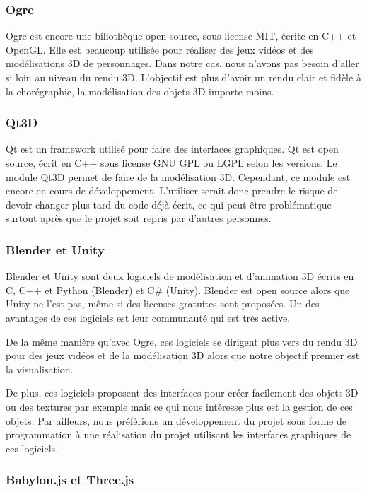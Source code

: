 \subsubsection{Ogre}

Ogre est encore une biliothèque open source, sous license MIT, écrite en C++ et OpenGL. Elle est beaucoup utilisée pour réaliser des jeux vidéos et des modélisations 3D de personnages. Dans notre cas, nous n'avons pas besoin d'aller si loin au niveau du rendu 3D. L'objectif est plus d'avoir un rendu clair et fidèle à la chorégraphie, la modélisation des objets 3D importe moins. 


\subsubsection{Qt3D}

Qt est un framework utilisé pour faire des interfaces graphiques. Qt est open source, écrit en C++ sous license GNU GPL ou LGPL selon les versions. Le module Qt3D permet de faire de la modélisation 3D. Cependant, ce module est encore en cours de développement. L'utiliser serait donc prendre le risque de devoir changer plus tard du code déjà écrit, ce qui peut être problématique surtout après que le projet soit repris par d'autres personnes. 

\subsubsection{Blender et Unity}

Blender et Unity sont deux logiciels de modélisation et d'animation 3D écrits en C, C++ et Python (Blender) et C\# (Unity). Blender est open source alors que Unity ne l'est pas, même si des licenses gratuites sont proposées. Un des avantages de ces logiciels est leur communauté qui est très active.

De la même manière qu'avec Ogre, ces logiciels se dirigent plus vers du rendu 3D pour des jeux vidéos et de la modélisation 3D alors que notre objectif premier est la visualisation. 

De plus, ces logiciels proposent des interfaces pour créer facilement des objets 3D ou des textures par exemple mais ce qui nous intéresse plus est la gestion de ces objets. Par ailleurs, nous préférions un développement du projet sous forme de programmation à une réalisation du projet utilisant les interfaces graphiques de ces logiciels.

\subsubsection{Babylon.js et Three.js}

